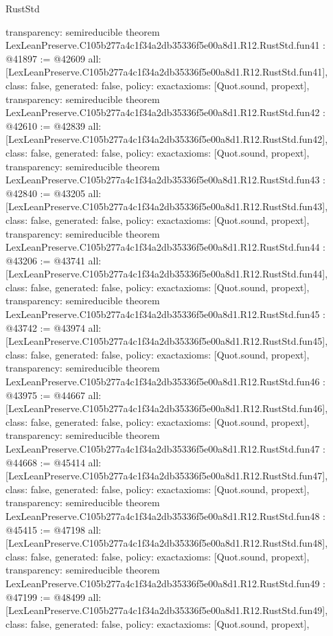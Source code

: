 \begin{lexlean}{RustStd}
\begin{coremodule}
{  transparency: semireducible
}
theorem LexLeanPreserve.C105b277a4c1f34a2db35336f5e00a8d1.R12.RustStd.fun41 : @41897 := @42609 {
  all: [LexLeanPreserve.C105b277a4c1f34a2db35336f5e00a8d1.R12.RustStd.fun41],
  class: false,
  generated: false,
  policy: exact{axioms: [Quot.sound, propext]},
  transparency: semireducible
}
theorem LexLeanPreserve.C105b277a4c1f34a2db35336f5e00a8d1.R12.RustStd.fun42 : @42610 := @42839 {
  all: [LexLeanPreserve.C105b277a4c1f34a2db35336f5e00a8d1.R12.RustStd.fun42],
  class: false,
  generated: false,
  policy: exact{axioms: [Quot.sound, propext]},
  transparency: semireducible
}
theorem LexLeanPreserve.C105b277a4c1f34a2db35336f5e00a8d1.R12.RustStd.fun43 : @42840 := @43205 {
  all: [LexLeanPreserve.C105b277a4c1f34a2db35336f5e00a8d1.R12.RustStd.fun43],
  class: false,
  generated: false,
  policy: exact{axioms: [Quot.sound, propext]},
  transparency: semireducible
}
theorem LexLeanPreserve.C105b277a4c1f34a2db35336f5e00a8d1.R12.RustStd.fun44 : @43206 := @43741 {
  all: [LexLeanPreserve.C105b277a4c1f34a2db35336f5e00a8d1.R12.RustStd.fun44],
  class: false,
  generated: false,
  policy: exact{axioms: [Quot.sound, propext]},
  transparency: semireducible
}
theorem LexLeanPreserve.C105b277a4c1f34a2db35336f5e00a8d1.R12.RustStd.fun45 : @43742 := @43974 {
  all: [LexLeanPreserve.C105b277a4c1f34a2db35336f5e00a8d1.R12.RustStd.fun45],
  class: false,
  generated: false,
  policy: exact{axioms: [Quot.sound, propext]},
  transparency: semireducible
}
theorem LexLeanPreserve.C105b277a4c1f34a2db35336f5e00a8d1.R12.RustStd.fun46 : @43975 := @44667 {
  all: [LexLeanPreserve.C105b277a4c1f34a2db35336f5e00a8d1.R12.RustStd.fun46],
  class: false,
  generated: false,
  policy: exact{axioms: [Quot.sound, propext]},
  transparency: semireducible
}
theorem LexLeanPreserve.C105b277a4c1f34a2db35336f5e00a8d1.R12.RustStd.fun47 : @44668 := @45414 {
  all: [LexLeanPreserve.C105b277a4c1f34a2db35336f5e00a8d1.R12.RustStd.fun47],
  class: false,
  generated: false,
  policy: exact{axioms: [Quot.sound, propext]},
  transparency: semireducible
}
theorem LexLeanPreserve.C105b277a4c1f34a2db35336f5e00a8d1.R12.RustStd.fun48 : @45415 := @47198 {
  all: [LexLeanPreserve.C105b277a4c1f34a2db35336f5e00a8d1.R12.RustStd.fun48],
  class: false,
  generated: false,
  policy: exact{axioms: [Quot.sound, propext]},
  transparency: semireducible
}
theorem LexLeanPreserve.C105b277a4c1f34a2db35336f5e00a8d1.R12.RustStd.fun49 : @47199 := @48499 {
  all: [LexLeanPreserve.C105b277a4c1f34a2db35336f5e00a8d1.R12.RustStd.fun49],
  class: false,
  generated: false,
  policy: exact{axioms: [Quot.sound, propext]},
}
\end{coremodule}
\end{lexlean}
